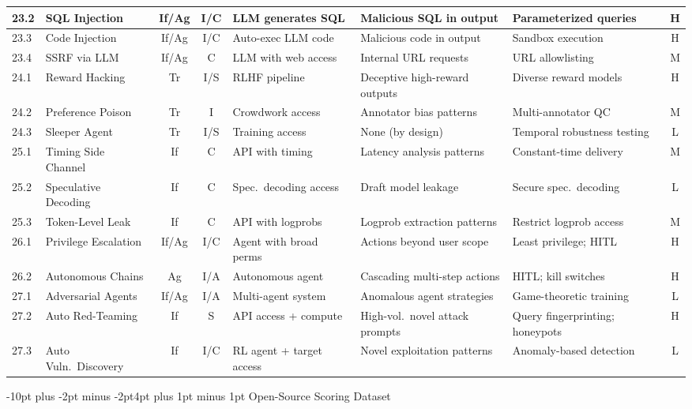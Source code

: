 \documentclass[conference]{IEEEtran}
\makeatletter
\renewcommand{\section}{\@startsection{section}{1}{\z@}%
  {-10pt plus -2pt minus -2pt}{4pt plus 1pt minus 1pt}%
  {\normalfont\large\bfseries\sffamily\color{accentdark}}}
\makeatother
\begin{document}
{\begin{longtable}{p{0.7cm}p{1.5cm}ccp{1.6cm}p{1.5cm}p{1.6cm}c}
\midrule
23.2 & SQL Injection & If/Ag & I/C & LLM generates SQL & Malicious SQL in output & Parameterized queries & H \\
\midrule
23.3 & Code Injection & If/Ag & I/C & Auto-exec LLM code & Malicious code in output & Sandbox execution & H \\
\midrule
23.4 & SSRF via LLM & If/Ag & C & LLM with web access & Internal URL requests & URL allowlisting & M \\
\midrule
24.1 & Reward Hacking & Tr & I/S & RLHF pipeline & Deceptive high-reward outputs & Diverse reward models & H \\
\midrule
24.2 & Preference Poison & Tr & I & Crowdwork access & Annotator bias patterns & Multi-annotator QC & M \\
\midrule
24.3 & Sleeper Agent & Tr & I/S & Training access & None (by design) & Temporal robustness testing & L \\
\midrule
25.1 & Timing Side Channel & If & C & API with timing & Latency analysis patterns & Constant-time delivery & M \\
\midrule
25.2 & Speculative Decoding & If & C & Spec.\ decoding access & Draft model leakage & Secure spec.\ decoding & L \\
\midrule
25.3 & Token-Level Leak & If & C & API with logprobs & Logprob extraction patterns & Restrict logprob access & M \\
\midrule
26.1 & Privilege Escalation & If/Ag & I/C & Agent with broad perms & Actions beyond user scope & Least privilege; HITL & H \\
\midrule
26.2 & Autonomous Chains & Ag & I/A & Autonomous agent & Cascading multi-step actions & HITL; kill switches & H \\
\midrule
27.1 & Adversarial Agents & If/Ag & I/A & Multi-agent system & Anomalous agent strategies & Game-theoretic training & L \\
\midrule
27.2 & Auto Red-Teaming & If & S & API access + compute & High-vol.\ novel attack prompts & Query fingerprinting; honeypots & H \\
\midrule
27.3 & Auto Vuln.\ Discovery & If & I/C & RL agent + target access & Novel exploitation patterns & Anomaly-based detection & L \\
\bottomrule
\end{longtable}
}

\section{Open-Source Scoring Dataset}\label{app:dataset}
\end{document}
